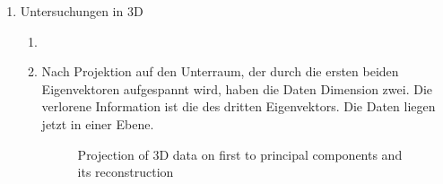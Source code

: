 \documentclass[]{report}
\newlength\figureheight
\begin{document}
\begin{enumerate}
	\item Untersuchungen in 3D
	\begin{enumerate}
		\item		
		\item
		Nach Projektion auf den Unterraum, der durch die ersten beiden Eigenvektoren aufgespannt wird, haben die Daten Dimension zwei. Die verlorene Information ist die des dritten Eigenvektors. Die Daten liegen jetzt in einer Ebene.
		\setlength\figureheight{10cm}
		\begin{figure}[tbp!]
			\centering
			
			\caption{Projection of 3D data on first to principal components and its reconstruction} 
			\label{fig:3D projection and reconstruction}
		\end{figure}
	\end{enumerate}
	

\end{enumerate}
\end{document}
